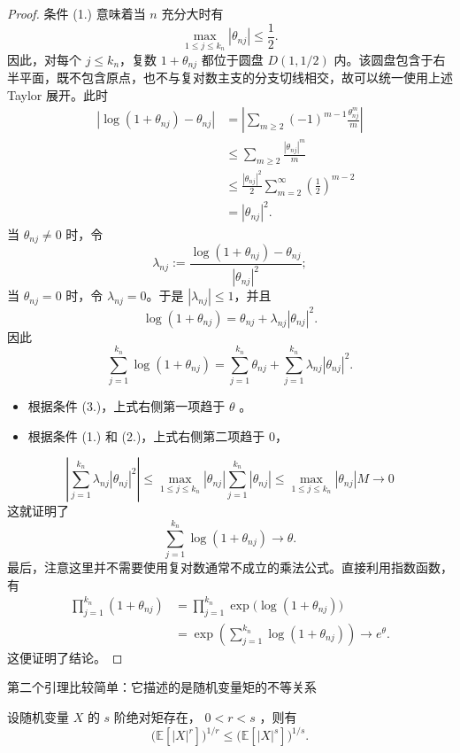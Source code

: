 \begin{proof}

条件 (1.) 意味着当 $n$ 充分大时有
\[
\max_{1\le j\le k_n}|\theta_{nj}|\le \frac12.
\]
因此，对每个 $j\le k_n$，复数 $1+\theta_{nj}$ 都位于圆盘 $D(1,1/2)$ 内。该圆盘包含于右半平面，既不包含原点，也不与复对数主支的分支切线相交，故可以统一使用上述 Taylor 展开。此时
\[
\begin{aligned}
\left|\log(1+\theta_{nj})-\theta_{nj}\right|
&=\left|\sum_{m\ge2}(-1)^{m-1}\frac{\theta_{nj}^m}{m}\right|\\
&\le \sum_{m\ge2}\frac{|\theta_{nj}|^m}{m}\\
&\le \frac{|\theta_{nj}|^2}{2}
  \sum_{m=2}^{\infty}\left(\frac12\right)^{m-2}\\
&=|\theta_{nj}|^2.
\end{aligned}
\]
当 $\theta_{nj}\ne0$ 时，令
\[
\lambda_{nj}
:=\frac{\log(1+\theta_{nj})-\theta_{nj}}{|\theta_{nj}|^2};
\]
当 $\theta_{nj}=0$ 时，令 $\lambda_{nj}=0$。于是 $|\lambda_{nj}|\le1$，并且
\[
\log(1+\theta_{nj})
=\theta_{nj}+\lambda_{nj}|\theta_{nj}|^2.
\]
因此
\[
\sum_{j=1}^{k_n}\log(1+\theta_{nj})
=\sum_{j=1}^{k_n}\theta_{nj}
+\sum_{j=1}^{k_n}\lambda_{nj}|\theta_{nj}|^2.
\]
\begin{itemize}
\tightlist
\item
  根据条件 (3.)，上式右侧第一项趋于 $\theta$ 。
\item
  根据条件 (1.) 和 (2.)，上式右侧第二项趋于 0，
\end{itemize}
\[\left|\sum_{j = 1}^{k_n}\lambda_{n j}|\theta_{n j}|^{2}\right|\leq \max_{1\leq j\leq k_{n}}|\theta_{n j}|\sum_{j = 1}^{k_{n}}|\theta_{n j}| \leq \max_{1\leq j\leq k_{n}}|\theta_{n j}|M \to 0\]
这就证明了
\[
\sum_{j=1}^{k_n}\log(1+\theta_{nj})\to\theta.
\]
最后，注意这里并不需要使用复对数通常不成立的乘法公式。直接利用指数函数，有
\[
\begin{aligned}
\prod_{j=1}^{k_n}(1+\theta_{nj})
&=\prod_{j=1}^{k_n}\exp\!\bigl(\log(1+\theta_{nj})\bigr)\\
&=\exp\!\left(\sum_{j=1}^{k_n}\log(1+\theta_{nj})\right)
\longrightarrow e^\theta.
\end{aligned}
\]
这便证明了结论。

\end{proof}

第二个引理比较简单：它描述的是随机变量矩的不等关系

\begin{lemma}

\label{lem:ch3:3-4}

设随机变量 $X$ 的 $s$ 阶绝对矩存在， $0<r<s$ ，则有
\[
\bigl(\mathbb{E}[|X|^r]\bigr)^{1/r} \le \bigl(\mathbb{E}[|X|^s]\bigr)^{1/s}.
\]

\end{lemma}

